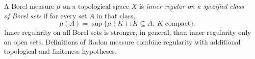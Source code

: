 
A Borel measure $\mu$ on a topological space $X$ is \emph{inner regular on a specified class of Borel sets} if for every set $A$ in that class,
\[
\mu(A)=\sup\{\mu(K):K\subseteq A,\ K\text{ compact}\}.
\]
Inner regularity on all Borel sets is stronger, in general, than inner regularity only on open sets. Definitions of Radon measure combine regularity with additional topological and finiteness hypotheses.
